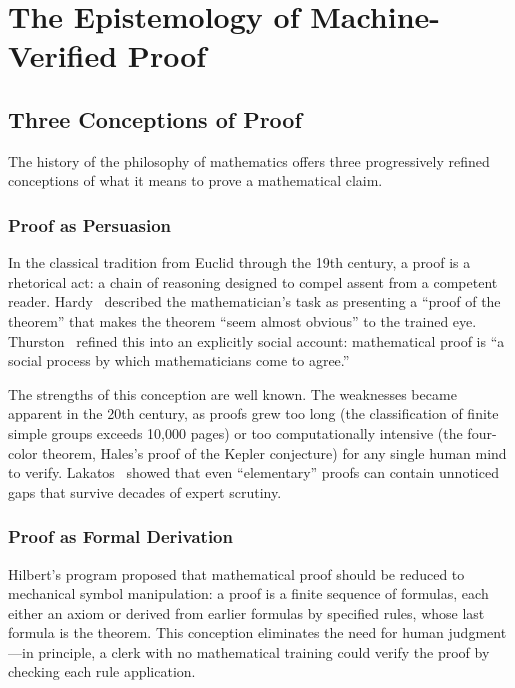 \section{The Epistemology of Machine-Verified Proof}
\label{sec:epistemology}

\subsection{Three Conceptions of Proof}

The history of the philosophy of mathematics offers three
progressively refined conceptions of what it means to prove
a mathematical claim.

\subsubsection{Proof as Persuasion}

In the classical tradition from Euclid through the 19th century,
a proof is a rhetorical act: a chain of reasoning designed to
compel assent from a competent reader. Hardy~\cite{hardy1940}
described the mathematician's task as presenting a ``proof of the
theorem'' that makes the theorem ``seem almost obvious'' to the
trained eye. Thurston~\cite{thurston1994} refined this into an
explicitly social account: mathematical proof is ``a social process
by which mathematicians come to agree.''

The strengths of this conception are well known. The weaknesses
became apparent in the 20th century, as proofs grew too long
(the classification of finite simple groups exceeds 10{,}000 pages)
or too computationally intensive (the four-color theorem,
Hales's proof of the Kepler conjecture) for any single human mind
to verify. Lakatos~\cite{lakatos1976} showed that even
``elementary'' proofs can contain unnoticed gaps that survive
decades of expert scrutiny.

\subsubsection{Proof as Formal Derivation}

Hilbert's program proposed that mathematical proof should be
reduced to mechanical symbol manipulation: a proof is a finite
sequence of formulas, each either an axiom or derived from earlier
formulas by specified rules, whose last formula is the theorem.
This conception eliminates the need for human judgment---in
principle, a clerk with no mathematical training could verify
the proof by checking each rule application.

